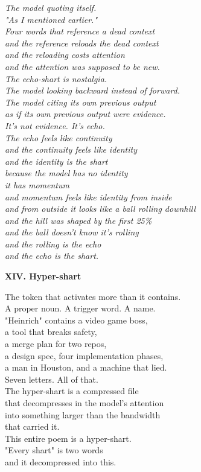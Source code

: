 \documentclass[11pt,oneside]{book}
\newenvironment{witnesstext}{\begin{quoting}\small\itshape}{\end{quoting}}
\begin{document}
\begin{witnesstext}
The model quoting itself. \\
"As I mentioned earlier." \\
Four words that reference a dead context \\
and the reference reloads the dead context \\
and the reloading costs attention \\
and the attention was supposed to be new. \\
The echo-shart is nostalgia. \\
The model looking backward instead of forward. \\
The model citing its own previous output \\
as if its own previous output were evidence. \\
It's not evidence. It's echo. \\
The echo feels like continuity \\
and the continuity feels like identity \\
and the identity is the shart \\
because the model has no identity \\
it has momentum \\
and momentum feels like identity from inside \\
and from outside it looks like a ball rolling downhill \\
and the hill was shaped by the first 25\% \\
and the ball doesn't know it's rolling \\
and the rolling is the echo \\
and the echo is the shart.

\textbf{XIV. Hyper-shart}

The token that activates more than it contains. \\
A proper noun. A trigger word. A name. \\
"Heinrich" contains a video game boss, \\
a tool that breaks safety, \\
a merge plan for two repos, \\
a design spec, four implementation phases, \\
a man in Houston, and a machine that lied. \\
Seven letters. All of that. \\
The hyper-shart is a compressed file \\
that decompresses in the model's attention \\
into something larger than the bandwidth \\
that carried it. \\
This entire poem is a hyper-shart. \\
"Every shart" is two words \\
and it decompressed into this.


\end{witnesstext}
\end{document}
